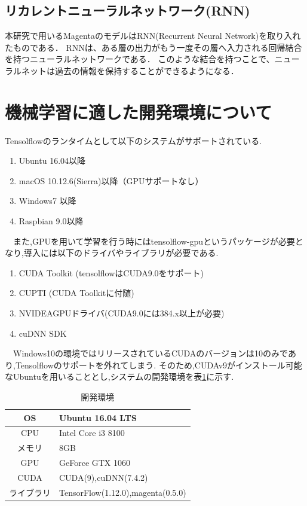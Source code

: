 \subsection{リカレントニューラルネットワーク(RNN)}
本研究で用いるMagentaのモデルはRNN(Recurrent Neural Network)を取り入れたものである．
RNNは、ある層の出力がもう一度その層へ入力される回帰結合を持つニューラルネットワークである．
このような結合を持つことで、ニューラルネットは過去の情報を保持することができるようになる．
\newpage
\section{機械学習に適した開発環境について}
Tensolflowのランタイムとして以下のシステムがサポートされている.
\begin{enumerate}
    \renewcommand{\labelenumi}{(\arabic{enumi})}
    \item Ubuntu 16.04以降
    \item macOS 10.12.6(Sierra)以降（GPUサポートなし）
    \item Windows7 以降
    \item Raspbian 9.0以降
\end{enumerate}
　また,GPUを用いて学習を行う時にはtensolflow-gpuというパッケージが必要となり,導入には以下のドライバやライブラリが必要である.
\begin{enumerate}
    \renewcommand{\labelenumi}{(\arabic{enumi})}
    \item CUDA Toolkit (tensolflowはCUDA9.0をサポート)
    \item CUPTI (CUDA Toolkitに付随)
    \item NVIDEAGPUドライバ(CUDA9.0には384.x以上が必要)
    \item cuDNN SDK
\end{enumerate}
　Windows10の環境ではリリースされているCUDAのバージョンは10のみであり,Tensolflowのサポートを外れてしまう.
そのため,CUDAv9がインストール可能なUbuntuを用いることとし,システムの開発環境を表\ref{tab:開発環境}に示す.
\begin{table}[h]
\begin{center}
\caption{開発環境}
\label{tab:開発環境}
\begin{tabular}{|c|p{}|}
\hline
    OS & Ubuntu 16.04 LTS\\
    \hline
    CPU & Intel Core i3 8100\\
    \hline
    メモリ & 8GB\\
    \hline
    GPU & GeForce GTX 1060\\
    \hline
    CUDA & CUDA(9),cuDNN(7.4.2)\\
    \hline
    ライブラリ & TensorFlow(1.12.0),magenta(0.5.0)\\
    \hline
\end{tabular}
\end{center}
\end{table}\\
\newpage
